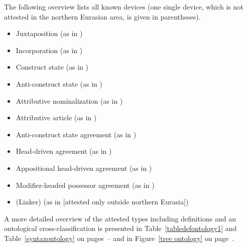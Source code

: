 The following overview lists all known devices (one single device, which is not attested in the northern Eurasian area, is given in parentheses).

\newpage 
\begin{itemize}
\item{Juxtaposition} (as in )
\item{Incorporation} (as in )
\item{Construct state} (as in )
\item{Anti\hyp{}construct state} (as in )
\item{Attributive nominalization} (as in )
\item{Attributive article} (as in )
\item{Anti\hyp{}construct state agreement} (as in )
\item{Head\hyp{}driven agreement} (as in )
\item{Appositional head\hyp{}driven agreement} (as in )
\item{Modifier\hyp{}headed possessor agreement} (as in )
\item{(Linker)} (as in  [attested only outside northern Eurasia])
\end{itemize}

A more detailed overview of the attested types including definitions and an ontological cross-classification is presented in Table~\ref{tabledefontology1} and Table~\ref{syntaxontology} on pages~\pageref{tabledefontology1}–\pageref{syntaxontology} and in Figure~\ref{tree ontology} on page~\pageref{tree ontology}.


